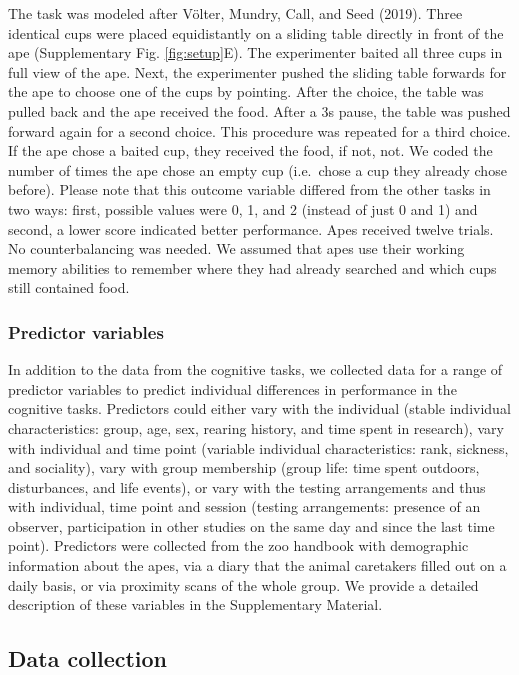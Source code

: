 \documentclass[
  man,floatsintext]{apa6}
\begin{document}
The task was modeled after Völter, Mundry, Call, and Seed (2019). Three identical cups were placed equidistantly on a sliding table directly in front of the ape (Supplementary Fig. \ref{fig:setup}E). The experimenter baited all three cups in full view of the ape. Next, the experimenter pushed the sliding table forwards for the ape to choose one of the cups by pointing. After the choice, the table was pulled back and the ape received the food. After a 3s pause, the table was pushed forward again for a second choice. This procedure was repeated for a third choice. If the ape chose a baited cup, they received the food, if not, not. We coded the number of times the ape chose an empty cup (i.e.~chose a cup they already chose before). Please note that this outcome variable differed from the other tasks in two ways: first, possible values were 0, 1, and 2 (instead of just 0 and 1) and second, a lower score indicated better performance. Apes received twelve trials. No counterbalancing was needed. We assumed that apes use their working memory abilities to remember where they had already searched and which cups still contained food.

\subsubsection{Predictor variables}\label{predictor-variables}

In addition to the data from the cognitive tasks, we collected data for a range of predictor variables to predict individual differences in performance in the cognitive tasks. Predictors could either vary with the individual (stable individual characteristics: group, age, sex, rearing history, and time spent in research), vary with individual and time point (variable individual characteristics: rank, sickness, and sociality), vary with group membership (group life: time spent outdoors, disturbances, and life events), or vary with the testing arrangements and thus with individual, time point and session (testing arrangements: presence of an observer, participation in other studies on the same day and since the last time point). Predictors were collected from the zoo handbook with demographic information about the apes, via a diary that the animal caretakers filled out on a daily basis, or via proximity scans of the whole group. We provide a detailed description of these variables in the Supplementary Material.

\subsection{Data collection}\label{data-collection}
\end{document}
